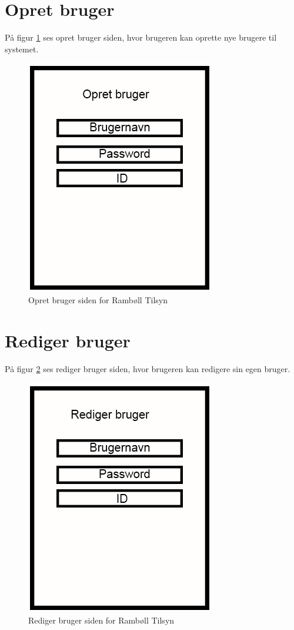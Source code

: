 \section{Opret bruger}\label{sec:OpretBrugerMock}
På figur \ref{fig:OpretBrugerMock} ses opret bruger siden, hvor brugeren kan oprette nye brugere til systemet.

\begin{figure}[H]
	\centering
	\includegraphics[width=0.4\linewidth]{MockUps/Mock/Ramboell-OpretBruger}
	\caption{Opret bruger siden for Rambøll Tilsyn}
	\label{fig:OpretBrugerMock}
\end{figure}

\clearpage

\section{Rediger bruger}\label{sec:RedigerBrugerMock}
På figur \ref{fig:RedigerBrugerMock} ses rediger bruger siden, hvor brugeren kan redigere sin egen bruger.

\begin{figure}[H]
	\centering
	\includegraphics[width=0.4\linewidth]{MockUps/Mock/Ramboell-RedigerBruger}
	\caption{Rediger bruger siden for Rambøll Tilsyn}
	\label{fig:RedigerBrugerMock}
\end{figure}

